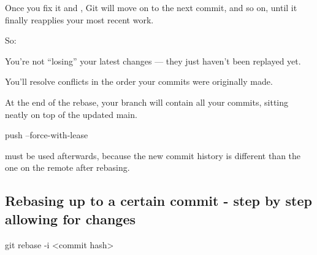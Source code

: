 Once you fix it and , Git will move on to the next commit, and so on, until it finally reapplies your most recent work.

So:

You’re not “losing” your latest changes — they just haven’t been replayed yet.

You’ll resolve conflicts in the order your commits were originally made.

At the end of the rebase, your branch will contain all your commits, sitting neatly on top of the updated main.

\begin{gitBashBox}
push --force-with-lease 
\end{gitBashBox}
must be used afterwards, because the new commit history is different than the one on the remote after rebasing.

\subsection{Rebasing up to a certain commit - step by step allowing for changes}
\begin{gitBashBox}
git rebase -i <commit hash>    
\end{gitBashBox}